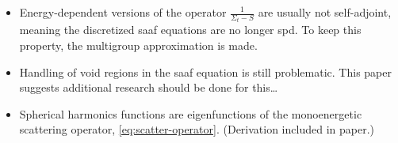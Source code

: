 \begin{itemize}
\begin{equation*}
              \psi\left(\rvec_b,\ohat \right) = f(\ohat),\quad \ohat\cdot \hat{n}<0
          \end{equation*}
          (note that $f\left(\ohat\right)=0$ for vacuum BC). In addition, we require \cref{eq:saaf-equation} to satisfy the first-order transport equation on the boundary for outgoing fluxes:
          \begin{equation*}
              \ohat\cdot\grad\psi\left(\rvec_b,\ohat\right)+\Sigma_t\psi\left(\rvec_b,\ohat\right)=S\psi\left(\rvec_b,\ohat\right)+q\left(\rvec_b,\ohat\right),\quad \ohat\cdot\hat{n}>0.
          \end{equation*}
    \item Energy-dependent versions of the operator $\frac{1}{\Sigma_t-S}$ are usually not self-adjoint, meaning the discretized \gls{saaf} equations are no longer \gls{spd}. To keep this property, the multigroup approximation is made.
    \item Handling of void regions in the \gls{saaf} equation is still problematic. This paper suggests additional research should be done for this\ldots
    \item Spherical harmonics functions are eigenfunctions of the monoenergetic scattering operator, \cref{eq:scatter-operator}. (Derivation included in paper.)
\end{itemize}

